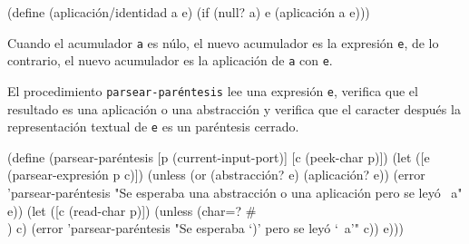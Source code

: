 \documentclass[letterpaper,twoside,openright,10pt]{book}
\begin{document}
\nwenddocs{}\plusendmoddef
(define (aplicación/identidad a e)
  (if (null? a) e (aplicación a e)))

\eatline
{}\nwendcode{}\nwdocspar

Cuando el acumulador {\tt{}a} es núlo, el nuevo acumulador es la expresión {\tt{}e}, de lo contrario, el nuevo acumulador es la aplicación de {\tt{}a} con {\tt{}e}.

El procedimiento {\tt{}\protect{}parsear-paréntesis} lee una expresión {\tt{}e}, verifica que el resultado es una aplicación o una abstracción y verifica que el caracter después la representación textual de {\tt{}e} es un paréntesis cerrado.

\nwenddocs{}\plusendmoddef
(define (parsear-paréntesis [p (current-input-port)]
                            [c (peek-char p)])
  (let ([e (parsear-expresión p c)])
    (unless (or (abstracción? e) (aplicación? e))
      (error 'parsear-paréntesis "Se esperaba una abstracción o una aplicación pero se leyó ~a" e))
    (let ([c (read-char p)])
      (unless (char=? #\\) c)
        (error 'parsear-paréntesis "Se esperaba `)' pero se leyó `~a'" c))
      e)))

\eatline
{}\nwendcode{}\nwdocspar
\end{document}
